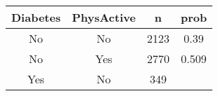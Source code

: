 \documentclass[]{book}
\theoremstyle{definition}
\theoremstyle{definition}
\theoremstyle{definition}
\theoremstyle{remark}
\begin{document}
\begin{longtable}[]{@{}cccc@{}}
\toprule
\begin{minipage}[b]{0.14\columnwidth}\centering\strut
Diabetes\strut
\end{minipage} & \begin{minipage}[b]{0.16\columnwidth}\centering\strut
PhysActive\strut
\end{minipage} & \begin{minipage}[b]{0.09\columnwidth}\centering\strut
n\strut
\end{minipage} & \begin{minipage}[b]{0.09\columnwidth}\centering\strut
prob\strut
\end{minipage}\tabularnewline
\midrule
\endhead
\begin{minipage}[t]{0.14\columnwidth}\centering\strut
No\strut
\end{minipage} & \begin{minipage}[t]{0.16\columnwidth}\centering\strut
No\strut
\end{minipage} & \begin{minipage}[t]{0.09\columnwidth}\centering\strut
2123\strut
\end{minipage} & \begin{minipage}[t]{0.09\columnwidth}\centering\strut
0.39\strut
\end{minipage}\tabularnewline
\begin{minipage}[t]{0.14\columnwidth}\centering\strut
No\strut
\end{minipage} & \begin{minipage}[t]{0.16\columnwidth}\centering\strut
Yes\strut
\end{minipage} & \begin{minipage}[t]{0.09\columnwidth}\centering\strut
2770\strut
\end{minipage} & \begin{minipage}[t]{0.09\columnwidth}\centering\strut
0.509\strut
\end{minipage}\tabularnewline
\begin{minipage}[t]{0.14\columnwidth}\centering\strut
Yes\strut
\end{minipage} & \begin{minipage}[t]{0.16\columnwidth}\centering\strut
No\strut
\end{minipage} & \begin{minipage}[t]{0.09\columnwidth}\centering\strut
349\strut
\end{minipage} & \begin{minipage}[t]{0.09\columnwidth}\centering\strut

\end{minipage}
\end{longtable}
\end{document}

